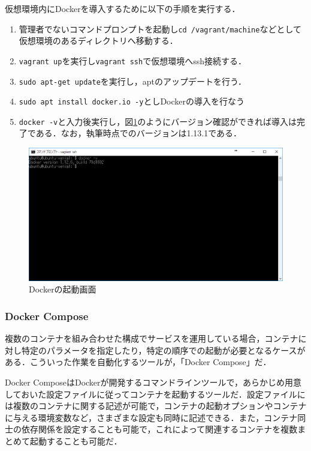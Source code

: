 仮想環境内にDockerを導入するために以下の手順を実行する．

\begin{enumerate}
\item 管理者でないコマンドプロンプトを起動し\texttt{cd /vagrant/machine}などとして仮想環境のあるディレクトリへ移動する．
\item \texttt{vagrant up}を実行し\texttt{vagrant ssh}で仮想環境へssh接続する．
\item \texttt{sudo apt-get update}を実行し，aptのアップデートを行う．
\item \texttt{sudo apt install docker.io -y}としDockerの導入を行なう
\item \texttt{docker -v}と入力後実行し，図\ref{docker}のようにバージョン確認ができれば導入は完了である．なお，執筆時点でのバージョンは1.13.1である．
\end{enumerate}


\begin{figure}[htb]
\centering
\includegraphics[width=12cm]{images/docker.png}
\caption{Dockerの起動画面}\label{docker}
\end{figure}

\newpage

\subsubsection{Docker Compose}
複数のコンテナを組み合わせた構成でサービスを運用している場合，コンテナに対し特定のパラメータを指定したり，特定の順序での起動が必要となるケースがある．こういった作業を自動化するツールが，「Docker Compose」だ．

Docker ComposeはDockerが開発するコマンドラインツールで，あらかじめ用意しておいた設定ファイルに従ってコンテナを起動するツールだ．設定ファイルには複数のコンテナに関する記述が可能で，コンテナの起動オプションやコンテナに与える環境変数など，さまざまな設定も同時に記述できる．また，コンテナ同士の依存関係を設定することも可能で，これによって関連するコンテナを複数まとめて起動することも可能だ．


